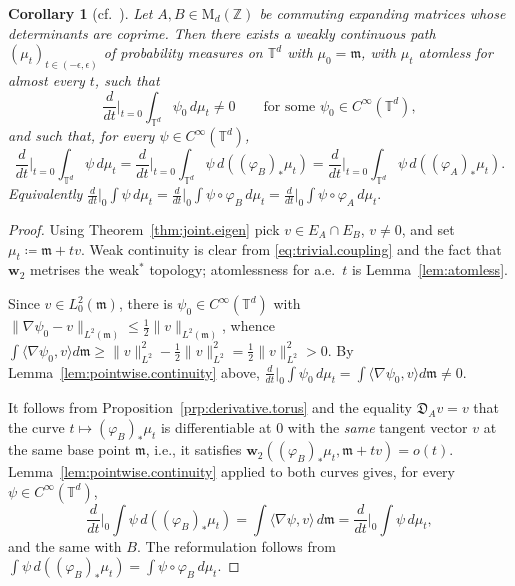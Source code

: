 \documentclass[11pt,reqno]{amsart}
\theoremstyle{plain}
\newtheorem{cor}[thm]{Corollary}
\theoremstyle{definition}
\newcommand{\dw}{\mathbf{w}_2}
\newcommand{\T}{\mathbb{T}}
\newcommand{\Z}{\mathbb{Z}}
\newcommand{\Leb}{\mathfrak{m}}
\newcommand{\D}{\mathfrak{D}}
\begin{document}
\begin{cor}[cf.\ {\cite[Corollary 1.8]{kloeckner_optimal_2013_preprint}}]
    \label{cor:weak}
    Let \( A,B\in \mathrm{M}_d(\Z) \) be commuting expanding matrices whose determinants are coprime.
    Then there exists a weakly continuous path \( (\mu_t)_{t\in(-\epsilon,\epsilon)} \) of probability measures on \( \T^d \) with \( \mu_0=\Leb \), with \( \mu_t \) atomless for almost every \( t \), such that
    \[
        \frac{d}{dt}\Big|_{t=0}\int_{\T^d}\psi_0\,d\mu_t\neq0\qquad\text{for some }\psi_0\in C^\infty(\T^d),
    \]
    and such that, for every \( \psi\in C^\infty(\T^d) \),
    \[
        \frac{d}{dt}\Big|_{t=0}\int_{\T^d}\psi\,d\mu_t
        =\frac{d}{dt}\Big|_{t=0}\int_{\T^d}\psi\,d\left(( \varphi_B )_\ast \mu_t\right)
        =\frac{d}{dt}\Big|_{t=0}\int_{\T^d}\psi\,d\left(( \varphi_A )_\ast \mu_t\right).
    \]
    Equivalently
    \( \frac{d}{dt}\big\lvert _{0}\int\psi\,d\mu_t=\frac{d}{dt}\big \rvert_{0}\int\psi\circ  \varphi_B \,d\mu_t =\frac{d}{dt}\big|_{0}\int\psi\circ  \varphi_A \,d\mu_t.\)
\end{cor}


\begin{proof}
    Using Theorem~\ref{thm:joint.eigen} pick \( v\in E_A\cap E_B \), \( v\neq0 \), and set \( \mu_t\coloneqq \Leb+tv \).
    Weak continuity is clear from \eqref{eq:trivial.coupling} and the fact that \( \dw \) metrises the weak\( ^\ast \) topology; atomlessness for a.e.\ \( t \) is Lemma~\ref{lem:atomless}.

    Since \( v\in L^2_0(\Leb) \), there is \( \psi_0\in C^\infty(\T^d) \) with \( \lVert \nabla\psi_0-v \rVert_{L^2(\Leb)}\le\frac12\lVert v \rVert_{L^2(\Leb)} \), whence
    $\int\langle\nabla\psi_0,v\rangle d\Leb\ge\lVert v \rVert^2_{L^2}-\frac12\lVert v \rVert^2_{L^2} =\frac12\lVert v \rVert^2_{L^2}>0$.
    By Lemma~\ref{lem:pointwise.continuity} above, $\frac{d}{dt}\big|_0\int\psi_0\,d\mu_t=\int\langle\nabla\psi_0,v\rangle d\Leb \neq0$.

    It follows from Proposition~\ref{prp:derivative.torus} and the equality \( \D_Av=v \) that the curve \( t\mapsto( \varphi_B )_\ast \mu_t \) is differentiable at \( 0 \) with the \emph{same} tangent vector \( v \) at the same base point \( \Leb \), i.e., it satisfies \( \dw\left(( \varphi_B )_\ast \mu_t,\Leb+tv\right)=o(t) \).
    Lemma~\ref{lem:pointwise.continuity} applied to both curves gives, for every \( \psi\in C^\infty(\T^d) \),
    \[
        \frac{d}{dt}\Big|_{0}\int\psi\,d\left(( \varphi_B )_\ast \mu_t\right)
        =\int\langle\nabla\psi,v\rangle\,d\Leb
        =\frac{d}{dt}\Big|_{0}\int\psi\,d\mu_t ,
    \]
    and the same with \( B \).
    The reformulation follows from \( \int\psi\,d\left(( \varphi_B )_\ast \mu_t\right)=\int\psi\circ  \varphi_B \,d\mu_t \).
\end{proof}
\end{document}
